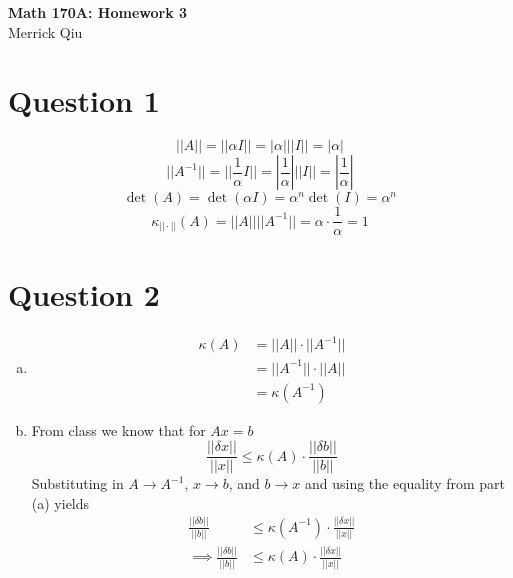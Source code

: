 \documentclass{article}
\newcommand{\inv}[1]{#1^{-1}}
\newcommand{\norm}[1]{||#1||}
\newcommand{\cond}{\kappa_{||\cdot||}}
\begin{document}
\begin{center}
	\huge{\bf Math 170A: Homework 3} \\
	Merrick Qiu
\end{center}

\section*{Question 1}
    \[
        ||A|| = ||\alpha I|| = |\alpha| ||I|| = |\alpha|
    \]
    \[
        ||A^{-1}|| = ||\frac{1}{\alpha} I||= |\frac{1}{\alpha}|||I|| = |\frac{1}{\alpha}|
    \]
    \[
        \det(A) = \det(\alpha I) = \alpha^n\det(I) = \alpha^n
    \]
    \[
        \cond(A) = \norm{A}\norm{\inv{A}} = \alpha \cdot \frac{1}{\alpha} = 1
    \]

\section*{Question 2}
\begin{enumerate}[(a)]
    \item \begin{align*}
        \kappa(A) &= \norm{A} \cdot \norm{\inv{A}}\\ 
        &= \norm{\inv{A}} \cdot \norm{A} \\
        &= \kappa(\inv{A})
    \end{align*}
    \item From class we know that for $Ax = b$
    \[  
        \frac{\norm{\delta x}}{\norm{x}} \leq \kappa(A) \cdot \frac{\norm{\delta b}}{\norm{b}}
    \]
    Substituting in $A \rightarrow \inv{A}$, $x \rightarrow b$, and $b \rightarrow x$
    and using the equality from part (a) yields
    \begin{align*}
        \frac{\norm{\delta b}}{\norm{b}} &\leq \kappa(\inv{A}) \cdot \frac{\norm{\delta x}}{\norm{x}} \\
        \implies \frac{\norm{\delta b}}{\norm{b}} &\leq \kappa(A) \cdot \frac{\norm{\delta x}}{\norm{x}}
    \end{align*}
\end{enumerate}
\end{document}
